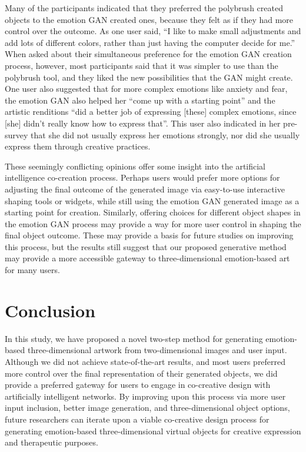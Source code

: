 \documentclass{sigchi}
\begin{document}
Many of the participants indicated that they preferred the polybrush created objects to the emotion GAN created ones, because they felt as if they had more control over the outcome. As one user said, “I like to make small adjustments and add lots of different colors, rather than just having the computer decide for me.” When asked about their simultaneous preference for the emotion GAN creation process, however, most participants said that it was simpler to use than the polybrush tool, and they liked the new possibilities that the GAN might create. One user also suggested that for more complex emotions like anxiety and fear, the emotion GAN also helped her “come up with a starting point” and the artistic renditions “did a better job of expressing [these] complex emotions, since [she] didn’t really know how to express that”. This user also indicated in her pre-survey that she did not usually express her emotions strongly, nor did she usually express them through creative practices.

These seemingly conflicting opinions offer some insight into the artificial intelligence co-creation process. Perhaps users would prefer more options for adjusting the final outcome of the generated image via easy-to-use interactive shaping tools or widgets, while still using the emotion GAN generated image as a starting point for creation. Similarly, offering choices for different object shapes in the emotion GAN process may provide a way for more user control in shaping the final object outcome. These may provide a basis for future studies on improving this process, but the results still suggest that our proposed generative method may provide a more accessible gateway to three-dimensional emotion-based art for many users. 

\section{Conclusion}
In this study, we have proposed a novel two-step method for generating emotion-based three-dimensional artwork from two-dimensional images and user input. Although we did not achieve state-of-the-art results, and most users preferred more control over the final representation of their generated objects, we did provide a preferred gateway for users to engage in co-creative design with artificially intelligent networks. By improving upon this process via more user input inclusion, better image generation, and three-dimensional object options, future researchers can iterate upon a viable co-creative design process for generating emotion-based three-dimensional virtual objects for creative expression and therapeutic purposes.
\end{document}
